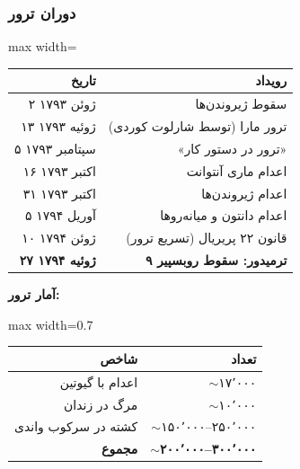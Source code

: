 \subsubsection{دوران ترور}

\begin{tcolorbox}[enemybox, title={\rl{دوران ترور: ژوئن ۱۷۹۳ – ژوئیه ۱۷۹۴}}]

\begin{center}
\begin{adjustbox}{max width=\linewidth}%
\begin{tabular}{rr}
\toprule
\rowcolor{AccentRed!15}
\color{AccentRed}\bfseries تاریخ & \color{AccentRed}\bfseries رویداد \\
\midrule
\rowcolor{BgWarm} ۲ ژوئن ۱۷۹۳ & سقوط ژیروندن‌ها \\
\rowcolor{BgCool} ۱۳ ژوئیه ۱۷۹۳ & ترور مارا (توسط شارلوت کوردی) \\
\rowcolor{BgWarm} ۵ سپتامبر ۱۷۹۳ & «ترور در دستور کار» \\
\rowcolor{BgCool} ۱۶ اکتبر ۱۷۹۳ & اعدام ماری آنتوانت \\
\rowcolor{BgWarm} ۳۱ اکتبر ۱۷۹۳ & اعدام ژیروندن‌ها \\
\rowcolor{BgCool} ۵ آوریل ۱۷۹۴ & اعدام دانتون و میانه‌روها \\
\rowcolor{BgWarm} ۱۰ ژوئن ۱۷۹۴ & قانون ۲۲ پریریال (تسریع ترور) \\
\rowcolor{AccentRed!20} \bfseries ۲۷ ژوئیه ۱۷۹۴
  & \bfseries ۹ ترمیدور: سقوط روبسپیر \\
\bottomrule
\end{tabular}
\end{adjustbox}
\end{center}

\vspace{0.5\baselineskip}

\textbf{آمار ترور:}
\begin{center}
\begin{adjustbox}{max width=0.7\linewidth}%
\begin{tabular}{rr}
\toprule
\bfseries شاخص & \bfseries تعداد \\
\midrule
اعدام با گیوتین & ${\sim}$۱۷٬۰۰۰ \\
مرگ در زندان & ${\sim}$۱۰٬۰۰۰ \\
کشته در سرکوب واندی & ${\sim}$۱۵۰٬۰۰۰–۲۵۰٬۰۰۰ \\
\midrule
\bfseries مجموع & \bfseries ${\sim}$۲۰۰٬۰۰۰–۳۰۰٬۰۰۰ \\
\bottomrule
\end{tabular}
\end{adjustbox}
\end{center}
\end{tcolorbox}

